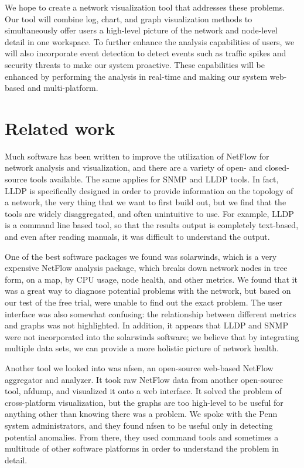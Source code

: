 \documentclass{sig-alternate}
\begin{document}
We hope to create a network visualization tool that addresses these problems.
Our tool will combine log, chart, and graph visualization methods to
simultaneously offer users a high-level picture of the network and node-level
detail in one workspace. To further enhance the analysis capabilities of users,
we will also incorporate event detection to detect events such as traffic spikes
and security threats to make our system proactive. These capabilities will be
enhanced by performing the analysis in real-time and making our system web-based
and multi-platform.

\section{Related work}

Much software has been written to improve the utilization of NetFlow for network
analysis and visualization, and there are a variety of open- and closed-source
tools available. The same applies for SNMP and LLDP tools. In fact, LLDP is
specifically designed in order to provide information on the topology of a
network, the very thing that we want to first build out, but we find that the
tools are widely disaggregated, and often unintuitive to use. For example, LLDP
is a command line based tool, so that the results output is completely
text-based, and even after reading manuals, it was difficult to understand the
output.

One of the best software packages we found was solarwinds, which is a very
expensive NetFlow analysis package, which breaks down network nodes in tree
form, on a map, by CPU usage, node health, and other metrics. We found that it
was a great way to diagnose potential problems with the network, but based on
our test of the free trial, were unable to find out the exact problem. The user
interface was also somewhat confusing: the relationship between different
metrics and graphs was not highlighted. In addition, it appears that LLDP and
SNMP were not incorporated into the solarwinds software; we believe that by
integrating multiple data sets, we can provide a more holistic picture of
network health.

Another tool we looked into was nfsen, an open-source web-based NetFlow
aggregator and analyzer. It took raw NetFlow data from another open-source tool,
nfdump, and visualized it onto a web interface. It solved the problem of
cross-platform visualization, but the graphs are too high-level to be useful for
anything other than knowing there was a problem. We spoke with the Penn system
administrators, and they found nfsen to be useful only in detecting potential
anomalies. From there, they used command tools and sometimes a multitude of
other software platforms in order to understand the problem in detail.
\end{document}
